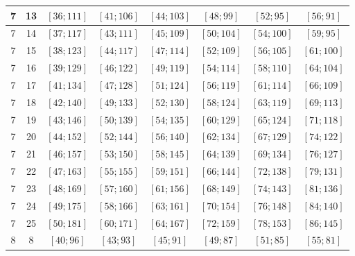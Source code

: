\documentclass[a4paper,12pt]{article}
\begin{document}
\begin{center}
{\begin{longtable}[H]{|c|c|c|c|c|c|c|c|}
7 &  13 &  $\left[ 36; 111\right]$ &  $\left[ 41; 106\right]$ &  $\left[ 44; 103\right]$ &  $\left[ 48; 99\right]$ &  $\left[ 52; 95\right]$ &  $\left[ 56; 91\right]$ \tabularnewline \hline
7 &  14 &  $\left[ 37; 117\right]$ &  $\left[ 43; 111\right]$ &  $\left[ 45; 109\right]$ &  $\left[ 50; 104\right]$ &  $\left[ 54; 100\right]$ &  $\left[ 59; 95\right]$ \tabularnewline \hline
7 &  15 &  $\left[ 38; 123\right]$ &  $\left[ 44; 117\right]$ &  $\left[ 47; 114\right]$ &  $\left[ 52; 109\right]$ &  $\left[ 56; 105\right]$ &  $\left[ 61; 100\right]$ \tabularnewline \hline
7 &  16 &  $\left[ 39; 129\right]$ &  $\left[ 46; 122\right]$ &  $\left[ 49; 119\right]$ &  $\left[ 54; 114\right]$ &  $\left[ 58; 110\right]$ &  $\left[ 64; 104\right]$ \tabularnewline \hline
7 &  17 &  $\left[ 41; 134\right]$ &  $\left[ 47; 128\right]$ &  $\left[ 51; 124\right]$ &  $\left[ 56; 119\right]$ &  $\left[ 61; 114\right]$ &  $\left[ 66; 109\right]$ \tabularnewline \hline
7 &  18 &  $\left[ 42; 140\right]$ &  $\left[ 49; 133\right]$ &  $\left[ 52; 130\right]$ &  $\left[ 58; 124\right]$ &  $\left[ 63; 119\right]$ &  $\left[ 69; 113\right]$ \tabularnewline \hline
7 &  19 &  $\left[ 43; 146\right]$ &  $\left[ 50; 139\right]$ &  $\left[ 54; 135\right]$ &  $\left[ 60; 129\right]$ &  $\left[ 65; 124\right]$ &  $\left[ 71; 118\right]$ \tabularnewline \hline
7 &  20 &  $\left[ 44; 152\right]$ &  $\left[ 52; 144\right]$ &  $\left[ 56; 140\right]$ &  $\left[ 62; 134\right]$ &  $\left[ 67; 129\right]$ &  $\left[ 74; 122\right]$ \tabularnewline \hline
7 &  21 &  $\left[ 46; 157\right]$ &  $\left[ 53; 150\right]$ &  $\left[ 58; 145\right]$ &  $\left[ 64; 139\right]$ &  $\left[ 69; 134\right]$ &  $\left[ 76; 127\right]$ \tabularnewline \hline
7 &  22 &  $\left[ 47; 163\right]$ &  $\left[ 55; 155\right]$ &  $\left[ 59; 151\right]$ &  $\left[ 66; 144\right]$ &  $\left[ 72; 138\right]$ &  $\left[ 79; 131\right]$ \tabularnewline \hline
7 &  23 &  $\left[ 48; 169\right]$ &  $\left[ 57; 160\right]$ &  $\left[ 61; 156\right]$ &  $\left[ 68; 149\right]$ &  $\left[ 74; 143\right]$ &  $\left[ 81; 136\right]$ \tabularnewline \hline
7 &  24 &  $\left[ 49; 175\right]$ &  $\left[ 58; 166\right]$ &  $\left[ 63; 161\right]$ &  $\left[ 70; 154\right]$ &  $\left[ 76; 148\right]$ &  $\left[ 84; 140\right]$ \tabularnewline \hline
7 &  25 &  $\left[ 50; 181\right]$ &  $\left[ 60; 171\right]$ &  $\left[ 64; 167\right]$ &  $\left[ 72; 159\right]$ &  $\left[ 78; 153\right]$ &  $\left[ 86; 145\right]$ \tabularnewline \hline
8 &  8 &  $\left[ 40; 96\right]$ &  $\left[ 43; 93\right]$ &  $\left[ 45; 91\right]$ &  $\left[ 49; 87\right]$ &  $\left[ 51; 85\right]$ &  $\left[ 55; 81\right]$ \tabularnewline \hline

\end{longtable}}
\end{center}
\end{document}
